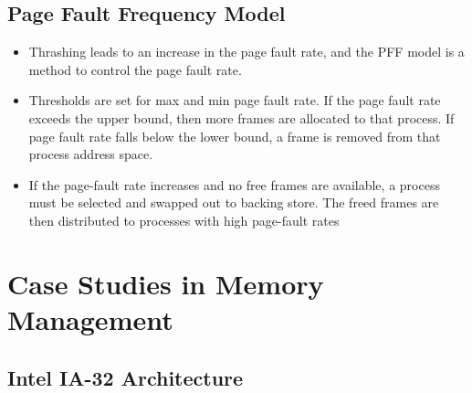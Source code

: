 \documentclass{article}
\theoremstyle{plain}
\theoremstyle{definition}
\begin{document}
\subsection{Page Fault Frequency Model}
\begin{itemize}
    \item Thrashing leads to an increase in the page fault rate, and the PFF model is a method to control the page fault rate. 
    
    \item Thresholds are set for max and min page fault rate. If the page fault rate exceeds the upper bound, then more frames are allocated to that process. If page fault rate falls below the lower bound, a frame is removed from that process address space.
    
    \item If the page-fault rate increases and no free frames are available, a process must be selected and swapped out to backing store. The freed frames are then distributed to processes with high page-fault rates
\end{itemize}

\section{Case Studies in Memory Management}
\subsection{Intel IA-32 Architecture}
\end{document}
